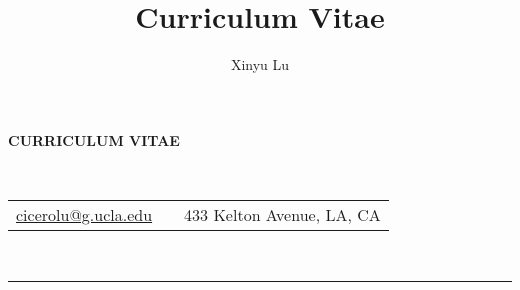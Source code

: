 \documentclass[10pt,letterpaper]{article}
\author{Xinyu Lu}
\title{Curriculum Vitae }
\begin{document}
\begin{center}
\begin{LARGE}
\textbf{CURRICULUM VITAE}
\end{LARGE}\\
\vspace{0.1\baselineskip}
\begin{large}
\begin{tabularx}{\textwidth}{LCR}
\href{mailto:cicerolu@g.ucla.edu}{cicerolu@g.ucla.edu} && 433 Kelton Avenue, LA, CA
\end{tabularx}
\end{large}\\
\vspace{-0.6\baselineskip}
\rule{\textwidth}{0.5pt}
\end{center}
\vspace*{0.5\baselineskip}
\end{document}
